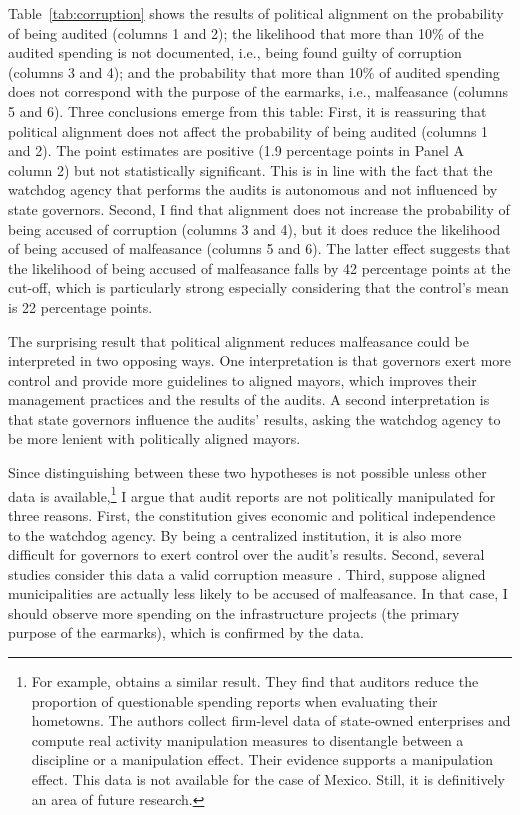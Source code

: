 \documentclass[dv_diss_main.tex]{subfiles}
\begin{document}
Table~\ref{tab:corruption} shows the results of political alignment on the probability of being audited (columns 1 and 2); the likelihood that more than 10\% of the audited spending is not documented, i.e., being found guilty of corruption (columns 3 and 4); and the probability that more than 10\% of audited spending does not correspond with the purpose of the earmarks, i.e., malfeasance (columns 5 and 6). Three conclusions emerge from this table: First, it is reassuring that political alignment does not affect the probability of being audited (columns 1 and 2). The point estimates are positive (1.9 percentage points in Panel A column 2) but not statistically significant.  This is in line with the fact that the watchdog agency that performs the audits is autonomous and not influenced by state governors. Second, I find that alignment does not increase the probability of being accused of corruption (columns 3 and 4), but it does reduce the likelihood of being accused of malfeasance (columns 5 and 6). The latter effect suggests that the likelihood of being accused of malfeasance falls by 42 percentage points at the cut-off, which is particularly strong especially considering that the control's mean is 22 percentage points.

The surprising result that political alignment reduces malfeasance could be interpreted in two opposing ways. One interpretation is that governors exert more control and provide more guidelines to aligned mayors, which improves their management practices and the results of the audits. A second interpretation is that state governors influence the audits' results, asking the watchdog agency to be more lenient with politically aligned mayors. 

Since distinguishing between these two hypotheses is not possible unless other data is available,\footnote{
For example, \cite{chu2020hometown} obtains a similar result. They find that auditors reduce the proportion of questionable spending reports when evaluating their hometowns. The authors collect firm-level data of state-owned enterprises and compute real activity manipulation measures to disentangle between a discipline or a manipulation effect. Their evidence supports a manipulation effect. This data is not available for the case of Mexico. Still, it is definitively an area of future research.} 
I argue that audit reports are not politically manipulated for three reasons. First, the constitution gives economic and political independence to the watchdog agency. By being a centralized institution, it is also more difficult for governors to exert control over the audit's results. Second, several studies consider this data a valid corruption measure \citep{chong2015does,arias2018priors,ajzenman2021power}. Third, suppose aligned municipalities are actually less likely to be accused of malfeasance. In that case, I should observe more spending on the infrastructure projects (the primary purpose of the earmarks), which is confirmed by the data.
\end{document}
